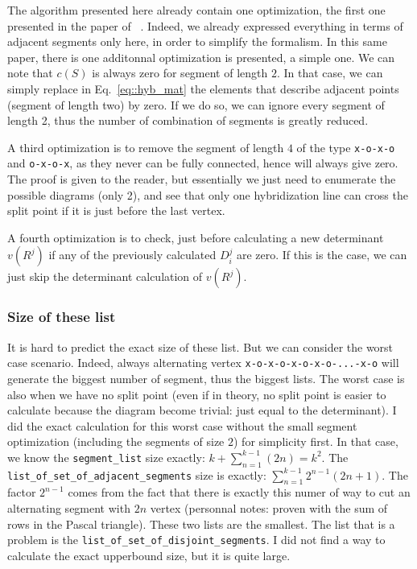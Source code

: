 \documentclass[10pt,letter]{article}
\begin{document}
The algorithm presented here already contain one optimization, the first one presented in the paper of ~\cite{boag_inclusion-exclusion_2018}. Indeed, we already expressed everything in terms of adjacent segments only here, in order to simplify the formalism. In this same paper, there is one additonnal optimization is presented, a simple one. We can note that $c(S)$ is always zero for segment of length $2$. In that case, we can simply replace in Eq.~\eqref{eq::hyb_mat} the elements that describe adjacent points (segment of length two) by zero. If we do so, we can ignore every segment of length 2, thus the number of combination of segments is greatly reduced. 

A third optimization is to remove the segment of length $4$ of the type \Verb#x-o-x-o# and  \Verb#o-x-o-x#, as they never can be fully connected, hence will always give zero. The proof is given to the reader, but essentially we just need to enumerate the possible diagrams (only 2), and see that only one hybridization line can cross the split point if it is just before the last vertex.

A fourth optimization is to check, just before calculating a new determinant $v(R^j)$ if any of the previously calculated $D^j_{i}$ are zero. If this is the case, we can just skip the determinant calculation of $v(R^j)$.

\subsubsection{Size of these list}

It is hard to predict the exact size of these list. But we can consider the worst case scenario. Indeed, always alternating vertex \Verb#x-o-x-o-x-o-x-o-...-x-o# will generate the biggest number of segment, thus the biggest lists. The worst case is also when we have no split point (even if in theory, no split point is easier to calculate because the diagram become trivial: just equal to the determinant). I did the exact calculation for this worst case without the small segment optimization (including the segments of size $2$) for simplicity first. In that case, we know the  \Verb#segment_list# size exactly: $k+\sum_{n=1}^{k-1} (2n) = k^2$. The \Verb#list_of_set_of_adjacent_segments# size is exactly: $\sum_{n=1}^{k-1} 2^{n-1}(2n+1) $. The factor $2^{n-1}$ comes from the fact that there is exactly this numer of way to cut an alternating segment with $2n$ vertex (personnal notes: proven with the sum of rows in the Pascal triangle). These two lists are the smallest. The list that is a problem is the  \Verb#list_of_set_of_disjoint_segments#. I did not find a way to calculate the exact upperbound size, but it is quite large.
\end{document}
